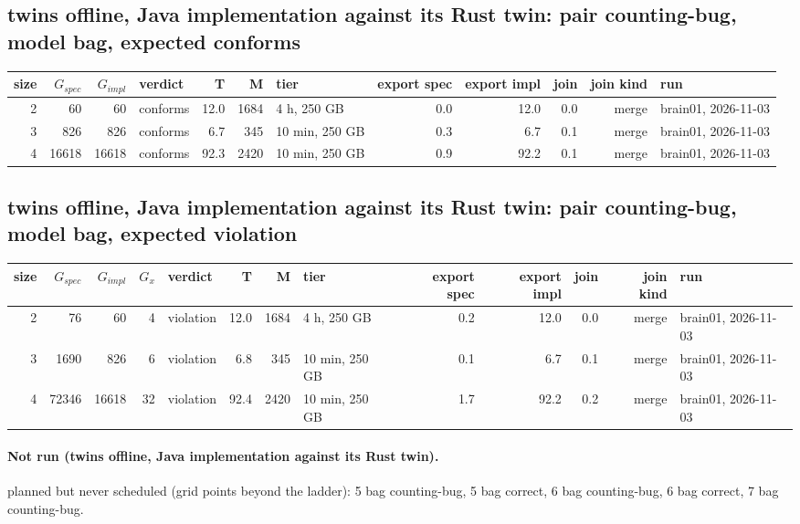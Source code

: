 \documentclass[10pt]{article}
\begin{document}
\subsection*{twins offline, Java implementation against its Rust twin: pair \textsf{counting-bug}, model bag, expected conforms}
\begin{longtable}{@{}rrrlrrlrrrrl@{}}
\toprule
size & $G_{\mathit{spec}}$ & $G_{\mathit{impl}}$ & verdict & T & M & tier & export spec & export impl & join & join kind & run \\
\midrule
\endhead
\color{blue} 2 & 60 & 60 & conforms & 12.0 & 1684 & 4 h, 250 GB & 0.0 & 12.0 & 0.0 & merge & brain01, 2026-11-03 \\
\color{blue} 3 & 826 & 826 & conforms & 6.7 & 345 & 10 min, 250 GB & 0.3 & 6.7 & 0.1 & merge & brain01, 2026-11-03 \\
\color{blue} 4 & 16618 & 16618 & conforms & 92.3 & 2420 & 10 min, 250 GB & 0.9 & 92.2 & 0.1 & merge & brain01, 2026-11-03 \\
\bottomrule
\end{longtable}
\subsection*{twins offline, Java implementation against its Rust twin: pair \textsf{counting-bug}, model bag, expected violation}
\begin{longtable}{@{}rrrrlrrlrrrrl@{}}
\toprule
size & $G_{\mathit{spec}}$ & $G_{\mathit{impl}}$ & $G_x$ & verdict & T & M & tier & export spec & export impl & join & join kind & run \\
\midrule
\endhead
\color{blue} 2 & 76 & 60 & 4 & violation & 12.0 & 1684 & 4 h, 250 GB & 0.2 & 12.0 & 0.0 & merge & brain01, 2026-11-03 \\
\color{blue} 3 & 1690 & 826 & 6 & violation & 6.8 & 345 & 10 min, 250 GB & 0.1 & 6.7 & 0.1 & merge & brain01, 2026-11-03 \\
\color{blue} 4 & 72346 & 16618 & 32 & violation & 92.4 & 2420 & 10 min, 250 GB & 1.7 & 92.2 & 0.2 & merge & brain01, 2026-11-03 \\
\bottomrule
\end{longtable}
\paragraph{Not run (twins offline, Java implementation against its Rust twin).}
planned but never scheduled (grid points beyond the ladder): 5 bag counting-bug, 5 bag correct, 6 bag counting-bug, 6 bag correct, 7 bag counting-bug.\par
\end{document}
